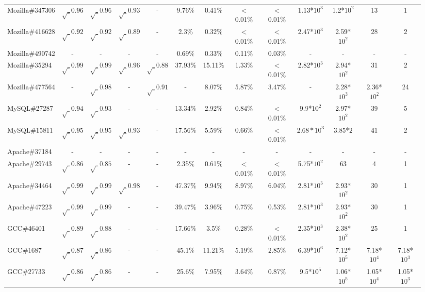 \begin{table}[h!]
\begin{tabular}{lcccccccccccc}
    Mozilla\#347306      & $\surd_{0.96}$ & $\surd_{0.96}$ & $\surd_{0.93}$  & - & 9.76\%  & 0.41\%  & $<$0.01\% & $<$0.01\% & 1.13*$10^{3}$ & 1.2*$10^{2}$ & 13 & 1 \\
    Mozilla\#416628      & $\surd_{0.92}$  & $\surd_{0.92}$  & $\surd_{0.89}$  & -  & 2.3\%  & 0.32\% & $<$0.01\% & $<$0.01\% & 2.47*$10^{3}$ & 2.59*$10^{2}$& 28 & 2  \\
    Mozilla\#490742      &  -  & -  & -  & - & 0.69\% & 0.33\% & 0.11\%  & 0.03\% &  - & - & - & -   \\
    Mozilla\#35294    & $\surd_{0.99}$ & $\surd_{0.99}$ & $\surd_{0.96}$ & $\surd_{0.88}$ & 37.93\% & 15.11\% & 1.33\% & $<$0.01\% & 2.82*$10^{3}$ & 2.94*$10^{2}$ & 31 & 2 \\
    Mozilla\#477564   & -  & $\surd_{0.98}$ & - & $\surd_{0.91}$ & -   & 8.07\% & 5.87\% & 3.47\% & -&2.28*$10^{3}$&2.36*${10^2}$&24 \\
    \midrule
    MySQL\#27287      &$\surd_{0.94}$ & $\surd_{0.93}$ & - & - & 13.34\% & 2.92\% & 0.84\% & $<$0.01\% & 9.9*${10^2}$ & 2.97*${10^2}$ & 39 & 5 \\
    MySQL\#15811      &$\surd_{0.95}$ & $\surd_{0.95}$ & $\surd_{0.93}$ & - &17.56\% & 5.59\% & 0.66\%& $<$0.01\% & $ 2.68*10^{3}$ & 3.85*${2}$ & 41&2 \\
    \midrule
    Apache\#37184     &  -  & -  & -  & - & - & - & -  & - &  - & - & - & -   \\
    Apache\#29743     & $\surd_{0.86}$  & $\surd_{0.85}$  & - & - & 2.35\% & 0.61\% & $<$0.01\% & $<$0.01\% & 5.75*${10^2}$& 63 & 4 & 1 \\
    Apache\#34464     & $\surd_{0.99}$  & $\surd_{0.99}$ &  $\surd_{0.98}$ & - & 47.37\% & 9.94\% & 8.97\% & 6.04\% & 2.81*${10^3}$ & 2.93*${10^2}$ & 30 & 1 \\
    Apache\#47223     & $\surd_{0.99}$  & $\surd_{0.99}$ & - & - & 39.47\% & 3.96\% & 0.75\% & 0.53\% & 2.81*${10^3}$ & 2.93*${10^2}$ & 30 & 1 \\
    \midrule
    GCC\#46401        & $\surd_{0.89}$ & $\surd_{0.88}$  & - & - & 17.66\% & 3.5\% & 0.28\% & $<$0.01\% & 2.35*${10^3}$ & 2.38*${10^2}$ & 25 & 1 \\
    GCC\#1687         & $\surd_{0.87}$ & $\surd_{0.86}$ & - & - & 45.1\% & 11.21\% & 5.19\% & 2.85\% & 6.39*${10^6}$ & 7.12*${10^5}$ & 7.18*$10^{4}$ & 7.18*$10^{3}$ \\
    GCC\#27733        & $\surd_{0.86}$ & $\surd_{0.86}$ & - & - & 25.6\% & 7.95\% & 3.64\% & 0.87\% & 9.5*${10^5}$ & 1.06*${10^5}$ & 1.05*$10^{4}$ & 1.05*$10^{3}$ \\

\end{tabular}
\end{table}
